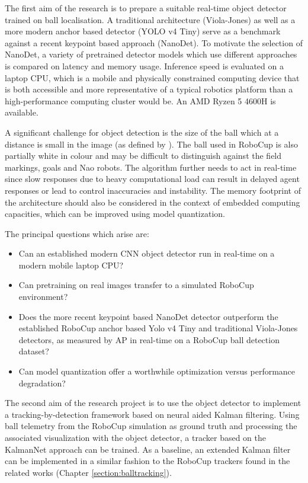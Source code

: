 \documentclass[a4paper,twoside,12pt]{report}
\begin{document}
The first aim of the research is to prepare a suitable real-time object detector trained on ball localisation. A traditional architecture (Viola-Jones) as well as a more modern anchor based detector (YOLO v4 Tiny) serve as a benchmark against a recent keypoint based approach (NanoDet). To motivate the selection of NanoDet, a variety of pretrained detector models which use different approaches is compared on latency and memory usage. Inference speed is evaluated on a laptop CPU, which is a mobile and physically constrained computing device that is both accessible and more representative of a typical robotics platform than a high-performance computing cluster would be. An AMD Ryzen 5 4600H is available. 

A significant challenge for object detection is the size of the ball which at a distance is small in the image (as defined by \cite{cocoeval}). The ball used in RoboCup is also partially white in colour and may be difficult to distinguish against the field markings, goals and Nao robots. The algorithm further needs to act in real-time since slow responses due to heavy computational load can result in delayed agent responses or lead to control inaccuracies and instability. The memory footprint of the architecture should also be considered in the context of embedded computing capacities, which can be improved using model quantization.

The principal questions which arise are:
\begin{itemize}
    \item Can an established modern CNN object detector run in real-time on a modern mobile laptop CPU?
    \item Can pretraining on real images transfer to a simulated RoboCup environment?
    \item Does the more recent keypoint based NanoDet detector outperform the established RoboCup anchor based Yolo v4 Tiny and traditional Viola-Jones detectors, as measured by AP in real-time on a RoboCup ball detection dataset? 
    \item Can model quantization offer a worthwhile optimization versus performance degradation? 
\end{itemize}

The second aim of the research project is to use the object detector to implement a tracking-by-detection framework based on neural aided Kalman filtering. Using ball telemetry from the RoboCup simulation as ground truth and processing the associated visualization with the object detector, a tracker based on the KalmanNet approach can be trained. As a baseline, an extended Kalman filter can be implemented in a similar fashion to the RoboCup trackers found in the related works (Chapter \ref{section:balltracking}). 
\end{document}
